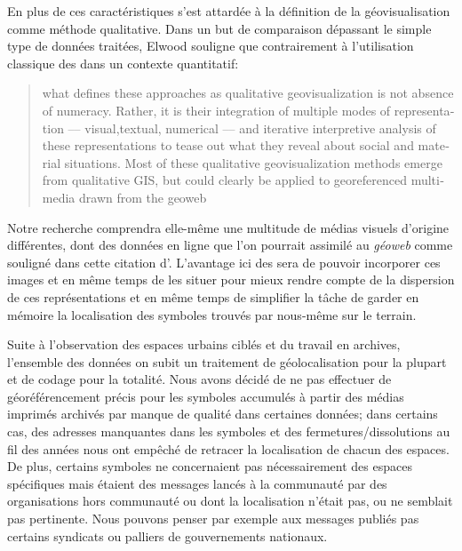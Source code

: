 En plus de ces caractéristiques \citet{Elwood2011} s'est attardée à la définition de la géovisualisation comme méthode qualitative. 
Dans un but de comparaison dépassant le simple type de données traitées, Elwood souligne que contrairement à l'utilisation classique des \sig{} dans un contexte quantitatif: \foreignblockquote{english}[{\cite{Elwood2011}}][.]{\textelp{} what defines   these approaches as qualitative geovisualization is not absence of numeracy.
  Rather, it is their integration of multiple modes of representation –--  visual,textual, numerical --– and iterative interpretive analysis of these representations to tease out what they reveal about social and material situations. 
Most of these qualitative geovisualization methods emerge from qualitative GIS, but could clearly be applied to georeferenced multimedia drawn from the geoweb}. 
Notre recherche comprendra elle-même une multitude de médias visuels d'origine différentes, dont des données en ligne que l'on pourrait assimilé au \emph{géoweb} comme souligné dans cette citation d'\citeauthor{Elwood2011}. 
L'avantage ici des \sig{} sera de pouvoir incorporer ces images et en même temps de les situer pour mieux rendre compte de la dispersion de ces représentations et en même temps de simplifier la tâche de garder en mémoire la localisation des symboles trouvés par nous-même sur le terrain.

Suite à l'observation des espaces urbains ciblés et du travail en archives, l'ensemble des données on subit un traitement de géolocalisation pour la plupart et de codage pour la totalité. 
Nous avons décidé de ne pas effectuer de géoréférencement précis pour les symboles accumulés à partir des médias imprimés archivés par manque de qualité dans certaines données; dans certains cas, des adresses manquantes dans les symboles et des fermetures/dissolutions au fil des années nous ont empêché de retracer la localisation de chacun des espaces. 
De plus, certains symboles ne concernaient pas nécessairement des espaces spécifiques mais étaient des messages lancés à la communauté par des organisations hors communauté ou dont la localisation n'était pas, ou ne semblait pas  pertinente. 
Nous pouvons penser par exemple aux messages publiés pas certains syndicats ou palliers de gouvernements nationaux.

